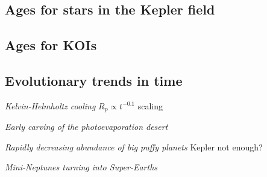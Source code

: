 \documentclass[11pt,twocolumn,tighten]{aastex63}
\begin{document}
\subsection{Ages for stars in the Kepler field}


%


\subsection{Ages for KOIs}

\subsection{Evolutionary trends in time}

{\it Kelvin-Helmholtz cooling}
$R_p \propto t^{-0.1}$ scaling \citep{Gupta_2019}

{\it Early carving of the photoevaporation desert}
\citep{Owen_Lai_2018}

{\it Rapidly decreasing abundance of big puffy planets}
Kepler not enough?

{\it Mini-Neptunes turning into Super-Earths}
\citep[e.g.][]{Rogers_2021}
\end{document}
